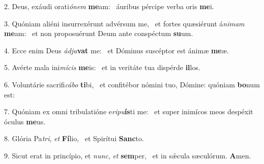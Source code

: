 2. Deus, exáudi orati\textit{ó}\textit{nem} \textbf{me}am: \ast\  áuribus pércipe verba oris \textbf{me}i.\

3. Quóniam aliéni insurrexérunt advérsum me, \dag\  et fortes quæsiérunt á\textit{ni}\textit{mam} \textbf{me}am: \ast\  et non proposuérunt Deum ante conspéctum \textbf{su}um.\

4. Ecce enim Deus \textit{ád}\textit{ju}\textbf{vat} me: \ast\  et Dóminus suscéptor est ánimæ \textbf{me}æ.\

5. Avérte mala ini\textit{mí}\textit{cis} \textbf{me}is: \ast\  et in veritáte tua dispérde \textbf{il}los.\

6. Voluntárie sacrifi\textit{cá}\textit{bo} \textbf{ti}bi, \ast\  et confitébor nómini tuo, Dómine: quóniam \textbf{bo}num est:\

7. Quóniam ex omni tribulatióne e\textit{ri}\textit{pu}\textbf{ís}ti me: \ast\  et super inimícos meos despéxit óculus \textbf{me}us.\

8. Glória Pa\textit{tri}, \textit{et} \textbf{Fí}lio, \ast\  et Spirítui \textbf{Sanc}to.\

9. Sicut erat in princípio, et \textit{nunc}, \textit{et} \textbf{sem}per, \ast\  et in sǽcula sæculórum. \textbf{A}men.\

